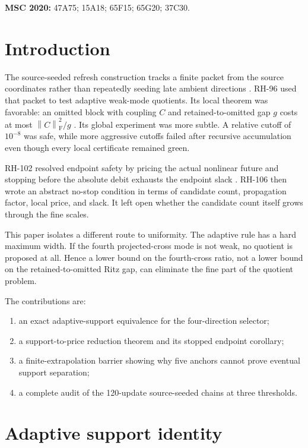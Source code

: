 \documentclass[11pt]{article}
\theoremstyle{definition}
\theoremstyle{remark}
\newcommand{\norm}[1]{\left\lVert#1\right\rVert}
\newcommand{\F}{\mathrm F}
\begin{document}
\medskip
\noindent\textbf{MSC 2020:} 47A75; 15A18; 65F15; 65G20; 37C30.

\section{Introduction}

The source-seeded refresh construction tracks a finite packet from the source
coordinates rather than repeatedly seeding late ambient directions
\citep{WangSourceSeeded2026}.  RH-96 used that packet to test adaptive weak-mode
quotients.  Its local theorem was favorable: an omitted block with coupling
$C$ and retained-to-omitted gap $g$ costs at most $\norm C_{\F}^2/g$
\citep{WangWeakQuotient2026}.  Its global experiment was more subtle.  A
relative cutoff of $10^{-8}$ was safe, while more aggressive cutoffs failed
after recursive accumulation even though every local certificate remained
green.

RH-102 resolved endpoint safety by pricing the actual nonlinear future and
stopping before the absolute debit exhausts the endpoint slack
\citep{WangStoppedClock2026}.  RH-106 then wrote an abstract no-stop condition
in terms of candidate count, propagation factor, local price, and slack.  It
left open whether the candidate count itself grows through the fine scales.

This paper isolates a different route to uniformity.  The adaptive rule has a
hard maximum width.  If the fourth projected-cross mode is not weak, no
quotient is proposed at all.  Hence a lower bound on the fourth-cross ratio,
not a lower bound on the retained-to-omitted Ritz gap, can eliminate the fine
part of the quotient problem.

The contributions are:
\begin{enumerate}[leftmargin=2.2em]
 \item an exact adaptive-support equivalence for the four-direction selector;
 \item a support-to-price reduction theorem and its stopped endpoint
       corollary;
 \item a finite-extrapolation barrier showing why five anchors cannot prove
       eventual support separation;
 \item a complete audit of the 120-update source-seeded chains at three
       thresholds.
\end{enumerate}

\section{Adaptive support identity}
\label{sec:selector}
\end{document}
